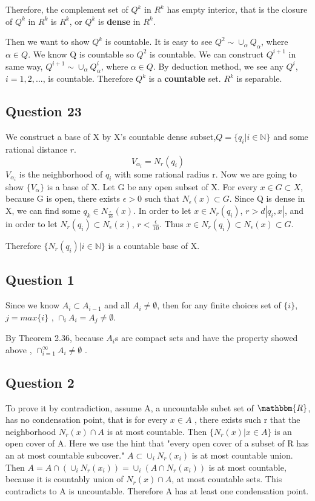 \documentclass{article}
\begin{document}
Therefore, the complement set of $Q^k$ in $R^k$ has empty interior, that is the closure of $Q^k$ in $R^k$ is $R^k$, or  $Q^k$ is \textbf{dense} in $R^k$.

Then we want to show $Q^k$  is countable. It is easy to see $Q^2 \sim \cup_{\alpha} Q_{\alpha}$, where $\alpha \in Q$. We know Q is countable so  $Q^2$ is countable.
We can construct $Q^{i+1}$ in same way, $Q^{i+1} \sim \cup_{\alpha} Q^{i}_{\alpha}$, where $\alpha \in Q$. By deduction method, we see any $Q^{i}$, $i = 1, 2, ... $, is countable.
Therefore $Q^k$ is a \textbf{countable} set. $R^k$ is separable.

\subsection*{Question 23}
We construct a base of X by X's countable dense subset,$Q = \{ q_{i} | i \in \mathbb{N} \} $ and some rational distance $r$.
\begin{equation}
  V_{\alpha_i} = N_{r}(q_i)
\end{equation}
$ V_{\alpha_i} $ is the neighborhood of $q_i$ with some rational radius r.
Now we are going to show $\{ V_{\alpha} \}$ is a base of X.
Let G be any open subset of X. For every $x \in G \subset X$, because G is open, there exists $\epsilon > 0$ such that $N_{\epsilon}(x) \subset G$.
Since Q is dense in X, we can find some $q_{k} \in N_{\frac{\epsilon}{10}}(x)$. In order to let $x \in N_{r}(q_i)$, $ r> d|q_i,x|  $,
and in order to let $N_{r}(q_i) \subset N_{\epsilon}(x) $, $ r < \frac{\epsilon}{10} $. Thus $x \in N_{r}(q_i) \subset N_{\epsilon}(x) \subset G$.

Therefore $\{ N_{r}(q_i) | i  \in \mathbb{N} \} $ is a countable base of X.

\subsection*{Question 1}
Since we know $ A_{i} \subset A_{i-1} $ and all $A_{i} \neq \emptyset $, then for any finite choices set of $\{ i\}$, $j = max\{ i\}$ , $\cap_{i} A_{i} = A_{j} \neq \emptyset$.

By Theorem 2.36, because $A_{i}$s are compact sets and have the property showed above , $\cap_{i=1}^{\infty} A_{i} \neq \emptyset$ .

\subsection*{Question 2}
To prove it by contradiction, assume A, a uncountable subet set of $\mathbbm{R}$, has no condensation point,
that is for every $x \in A$ , there exists such r that the neighborhood $N_{r}(x) \cap A $ is at most countable.
Then $\{ N_{r}(x) | x \in A\}$ is an open cover of A. Here we use the hint that "every open cover of a subset of R has an at most countable subcover."
$ A \subset \cup_i N_{r}(x_i)$ is at most countable union. Then $ A = A \cap (\cup_i N_{r}(x_i)) = \cup_i (A \cap N_{r}(x_i))$ is at most countable, because it is countably union of $N_{r}(x) \cap A $, at most countable sets.
This contradicts to A is uncountable. Therefore A has at least one condensation point.
\end{document}
